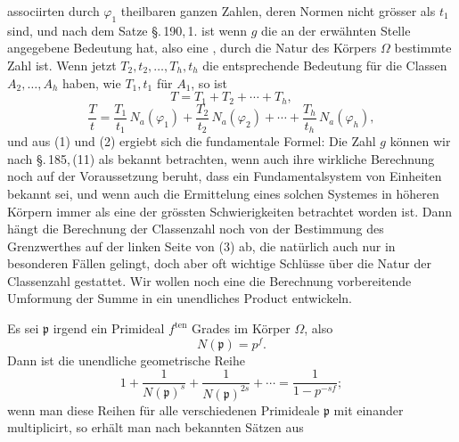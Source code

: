 associirten durch $\varphi_1$ theilbaren ganzen Zahlen, deren Normen nicht grösser als $t_1$ sind, und nach dem Satze \S.\,190,\,1. ist
wenn $g$ die an der erwähnten Stelle angegebene Bedeutung hat, also eine , durch die Natur des Körpers $\Omega$ bestimmte Zahl ist. Wenn jetzt $T_2, t_2, \ldots, T_h, t_h$ die entsprechende Bedeutung für die Classen $A_2, \ldots, A_h$ haben, wie $T_1, t_1$ für $A_1$, so ist
\[
T = T_1 + T_2 + \cdots + T_h,
\]
\[
\frac{T}{t} = \frac{T_1}{t_1}\, N_a(\varphi_1) + \frac{T_2}{t_2}\, N_a(\varphi_2) + \cdots + \frac{T_h}{t_h}\, N_a(\varphi_h),
\]
und aus (1) und (2) ergiebt sich die fundamentale Formel:
Die Zahl $g$ können wir nach \S.\,185,\,(11) als bekannt betrachten, wenn auch ihre wirkliche Berechnung noch auf der Voraussetzung beruht, dass ein Fundamentalsystem von Einheiten bekannt sei, und wenn auch die Ermittelung eines solchen Systemes in höheren Körpern immer als eine der grössten Schwierigkeiten betrachtet worden ist. Dann hängt die Berechnung der Classenzahl noch von der Bestimmung des Grenzwerthes auf der linken Seite von (3) ab, die natürlich auch nur in besonderen Fällen gelingt, doch aber oft wichtige Schlüsse über die Natur der Classenzahl gestattet. Wir wollen noch eine die Berechnung vorbereitende Umformung der Summe
in ein unendliches Product entwickeln.

Es sei $\mathfrak{p}$ irgend ein Primideal $f^{\mathrm{ten}}$ Grades im Körper $\Omega$, also
\[
N(\mathfrak{p}) = p^f.
\]
Dann ist die unendliche geometrische Reihe
\[
1 + \frac{1}{N(\mathfrak{p})^s} + \frac{1}{N(\mathfrak{p})^{2s}} + \cdots = \frac{1}{1-p^{-sf}};
\]
wenn man diese Reihen für alle verschiedenen Primideale $\mathfrak{p}$ mit einander multiplicirt, so erhält man nach bekannten Sätzen aus
